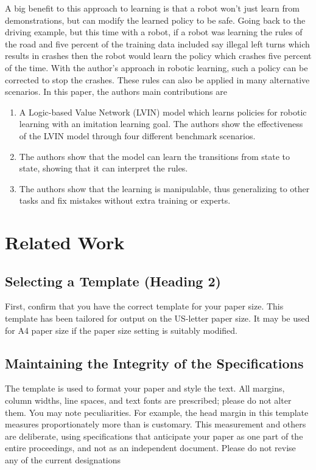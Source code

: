\documentclass[letterpaper, 10 pt, conference]{ieeeconf}  %
\begin{document}
\indent A big benefit to this approach to learning is that a robot won't just learn from demonstrations, but can modify the learned policy to be safe. Going back to the driving example, but this time with a robot, if a robot was learning the rules of the road and five percent of the training data included say illegal left turns which results in crashes then the robot would learn the policy which crashes five percent of the time. With the author's approach in robotic learning, such a policy can be corrected to stop the crashes. These rules can also be applied in many alternative scenarios. 
\newline
\indent In this paper, the authors main contributions are
\begin{enumerate}
  \item A Logic-based Value Network (LVIN) model which learns policies for robotic learning with an imitation learning goal. The authors show the effectiveness of the LVIN model through four different benchmark scenarios.
  \item The authors show that the model can learn the transitions from state to state, showing that it can interpret the rules.
  \item  The authors show that the learning is manipulable, thus generalizing to other tasks and fix mistakes without extra training or experts.
\end{enumerate}

\section{Related Work}

\subsection{Selecting a Template (Heading 2)}

First, confirm that you have the correct template for your paper size. This template has been tailored for output on the US-letter paper size. 
It may be used for A4 paper size if the paper size setting is suitably modified.

\subsection{Maintaining the Integrity of the Specifications}

The template is used to format your paper and style the text. All margins, column widths, line spaces, and text fonts are prescribed; please do not alter them. You may note peculiarities. For example, the head margin in this template measures proportionately more than is customary. This measurement and others are deliberate, using specifications that anticipate your paper as one part of the entire proceedings, and not as an independent document. Please do not revise any of the current designations
\end{document}
